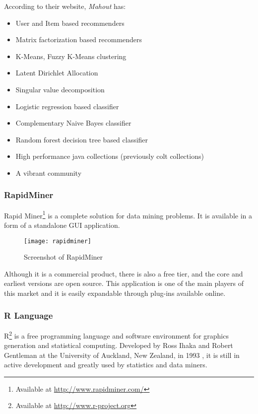 According to their website, \emph{Mahout} has: \begin{itemize}

\item User and Item based recommenders \item Matrix factorization based
recommenders \item K-Means, Fuzzy K-Means clustering \item Latent Dirichlet
Allocation \item Singular value decomposition \item Logistic regression based
classifier \item Complementary Naive Bayes classifier \item Random forest
decision tree based classifier \item High performance java collections
(previously colt collections) \item  A vibrant community

\end{itemize}

\subsubsection{RapidMiner}

Rapid Miner\footnote{ Available at \url{http://www.rapidminer.com/}} is a
complete solution for data mining problems. It is available in a form of a
standalone GUI application. \begin{figure}[h] \begin{center} \leavevmode
  \texttt{[image: rapidminer]} \caption{Screenshot of
RapidMiner \protect\footnotemark} \label{fig:RapidMiner} \end{center}
\end{figure} 
Although it is a commercial product, there is also a free tier, and the core and
earliest versions are open source. This application is one of the main players
of this market and it is easily expandable through plug-ins available online.

\subsubsection{R Language} R\footnote{ Available at
\url{http://www.r-project.org}} is a free programming language and software
environment for graphics generation and statistical computing. Developed by Ross
Ihaka and Robert Gentleman at the University of Auckland, New Zealand, in 1993
\cite{Ihaka98r:past}, it is still in active development and greatly used by
statistics and data miners.

